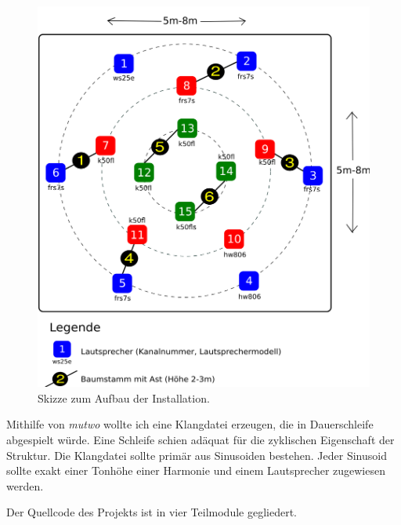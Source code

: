 \documentclass[12pt,a4paper,ngerman]{article}
\begin{document}
\begin{figure}[h!]
        \hspace{0.5cm}
        \includegraphics[scale=0.185]{pictures/setup-thanatos-trees.png}
    \caption{%
        Skizze zum Aufbau der Installation.
    }
\end{figure}

Mithilfe von \emph{mutwo} wollte ich eine Klangdatei erzeugen, die in Dauerschleife abgespielt würde.
Eine Schleife schien adäquat für die zyklischen Eigenschaft der Struktur.
Die Klangdatei sollte primär aus Sinusoiden bestehen.
Jeder Sinusoid sollte exakt einer Tonhöhe einer Harmonie und einem Lautsprecher zugewiesen werden.

\smallskip

Der Quellcode des Projekts ist in vier Teilmodule gegliedert.
\end{document}

